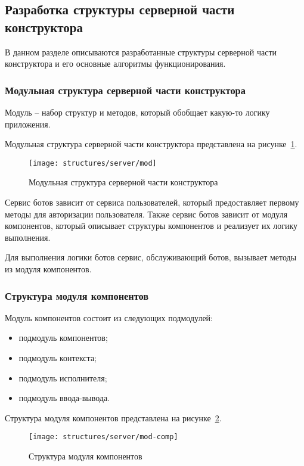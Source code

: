 
\subsection{Разработка структуры серверной части конструктора}


В данном разделе описываются разработанные структуры серверной части
конструктора и его основные алгоритмы функционирования.

\subsubsection{Модульная структура серверной части конструктора}

Модуль – набор структур и методов, который обобщает какую-то логику
приложения.

Модульная структура серверной части конструктора представлена на
рисунке~\ref{f:mod-server-struct}.

\begin{figure}[ht]
	\centering
	\texttt{[image: structures/server/mod]}
	\caption{Модульная структура серверной части конструктора}
	\label{f:mod-server-struct}
\end{figure}

Сервис ботов зависит от сервиса пользователей, который предоставляет
первому методы для авторизации пользователя. Также сервис ботов зависит
от модуля компонентов, который описывает структуры компонентов и
реализует их логику выполнения.

Для выполнения логики ботов сервис, обслуживающий ботов, вызывает
методы из модуля компонентов.

\subsubsection{Структура модуля компонентов}

Модуль компонентов состоит из следующих подмодулей:
\begin{itemize}
	\item подмодуль компонентов;
	\item подмодуль контекста;
	\item подмодуль исполнителя;
	\item подмодуль ввода-вывода.
\end{itemize}

Структура модуля компонентов представлена на рисунке~\ref{f:mod-comp-struct}.

\begin{figure}[ht]
	\centering
	\texttt{[image: structures/server/mod-comp]}
	\caption{Структура модуля компонентов}
	\label{f:mod-comp-struct}
\end{figure}

